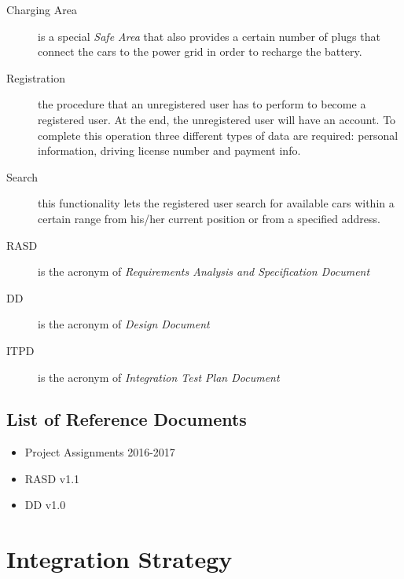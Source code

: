 \documentclass[11pt,a4paper]{report}
\begin{document}
\begin{description}
	\item[Charging Area] is a special \textit{Safe Area} that also provides a certain number of plugs that connect the cars to the power grid in order to recharge the battery.
	\item[Registration] the procedure that an unregistered user has to perform to become a registered user. At the end, the unregistered user will have an account. To complete this operation three different types of data are required: personal information, driving license number and payment info.
	\item[Search] this functionality lets the registered user search for available cars within a certain range from his/her current position or from a specified address.
	\item[RASD] is the acronym of \textit{Requirements Analysis and Specification Document}
	\item[DD] is the acronym of \textit{Design Document}
	\item[ITPD] is the acronym of \textit{Integration Test Plan Document}
\end{description}
\section{List of Reference Documents}
	\begin{itemize}
		\item Project Assignments 2016-2017
		\item RASD v1.1
		\item DD v1.0
	\end{itemize}
\chapter{Integration Strategy}
\end{document}
